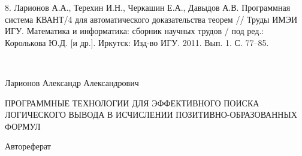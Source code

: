 \documentclass[a4paper]{report}
\begin{document}
8. Ларионов А.А., Терехин И.Н., Черкашин Е.А., Давыдов А.В.
Программная система КВАНТ/4 для автоматического доказательства теорем
// Труды ИМЭИ ИГУ. Математика и информатика: сборник научных трудов / под ред.: Королькова Ю.Д. [и др.]. Иркутск: Изд-во ИГУ. 2011. Вып. 1. С. 77--85.







\mbox{~}
\vfill{}
\begin{center}

Ларионов Александр Александрович

ПРОГРАММНЫЕ ТЕХНОЛОГИИ ДЛЯ ЭФФЕКТИВНОГО ПОИСКА ЛОГИЧЕСКОГО ВЫВОДА В ИСЧИСЛЕНИИ ПОЗИТИВНО-ОБРАЗОВАННЫХ ФОРМУЛ

Автореферат

\end{center}
\vspace{1cm}{}
\mbox{~}
%
%
%
%
%

%

%
\end{document}
